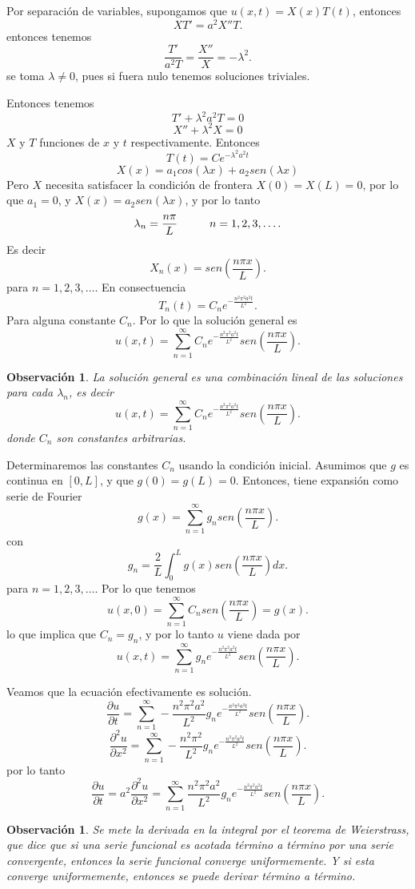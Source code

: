 \documentclass[11pt]{book}
\theoremstyle{plain}
\newtheorem{obs}[proposición]{Observación}
\theoremstyle{definition}
\begin{document}
Por separación de variables, supongamos que $u(x,t) = X(x)T(t)$, entonces
\[
XT' = a^{2}X''T
.\]
entonces tenemos
\[
\frac{T'}{a^{2}T} = \frac{X''}{X} = -\lambda^{2}
.\]
se toma $\lambda \neq 0$, pues si fuera nulo tenemos soluciones triviales.

Entonces tenemos
\[
T' + \lambda^{2}a^{2}T = 0
\]
\[
X'' + \lambda^{2}X = 0
\]
$X$ y $T$ funciones de $x$ y $t$ respectivamente. Entonces
\[
T(t) = C e^{-\lambda^{2}a^{2}t}
\]
\[
X(x) = a_{1}cos(\lambda x) + a_{2}sen(\lambda x)
\]
Pero $X$ necesita satisfacer la condición de frontera $X(0) = X(L) = 0$, por lo que $a_{1} = 0$, y $X(x) = a_{2}sen(\lambda x)$, y por lo tanto
\[
    \lambda_{n} = \frac{n\pi}{L} \hspace{10mm} n = 1,2,3,\dots
.\]
Es decir 
\[
    X_{n}(x) = sen(\frac{n\pi x}{L})
.\]
para $n = 1,2,3,\dots$. En consectuencia
\[
    T_{n}(t) = C_{n}e^{-\frac{n^{2}\pi^{2}a^{2}t}{L^{2}}}
.\]
Para alguna constante $C_{n}$. Por lo que la solución general es
\[
    u(x,t) = \sum_{n=1}^{\infty} C_{n}e^{-\frac{n^{2}\pi^{2}a^{2}t}{L^{2}}}sen(\frac{n\pi x}{L})
.\]

\begin{obs}
    La solución general es una combinación lineal de las soluciones para cada $\lambda_{n}$, es decir
    \[
        u(x,t) = \sum_{n=1}^{\infty} C_{n}e^{-\frac{n^{2}\pi^{2}a^{2}t}{L^{2}}}sen(\frac{n\pi x}{L})
    .\]
    donde $C_{n}$ son constantes arbitrarias.
\end{obs}

Determinaremos las constantes $C_{n}$ usando la condición inicial. Asumimos que $g$ es continua en $[0,L]$, y que $g(0) = g(L) = 0$. Entonces, tiene expansión como serie de Fourier
\[
    g(x) = \sum_{n=1}^{\infty} g_{n}sen(\frac{n\pi x}{L})
.\]
con
\[
    g_{n} = \frac{2}{L}\int_{0}^{L} g(x)sen(\frac{n\pi x}{L})dx
.\]
para $n = 1,2,3,\dots$. Por lo que tenemos 
\[
    u(x,0) = \sum_{n=1}^{\infty} C_{n}sen(\frac{n\pi x}{L}) = g(x)
.\]
lo que implica que $C_{n} = g_{n}$, y por lo tanto $u$ viene dada por
\[
    u(x,t) = \sum_{n=1}^{\infty} g_{n}e^{-\frac{n^{2}\pi^{2}a^{2}t}{L^{2}}}sen(\frac{n\pi x}{L})
.\]

Veamos que la ecuación efectivamente es solución.
\[
    \frac{\partial u}{\partial t} = \sum_{n=1}^{\infty} -\frac{n^{2}\pi^{2}a^{2}}{L^{2}}g_{n}e^{-\frac{n^{2}\pi^{2}a^{2}t}{L^{2}}}sen(\frac{n\pi x}{L})
.\]
\[
    \frac{\partial^2 u}{\partial x^2} = \sum_{n=1}^{\infty} -\frac{n^{2}\pi^{2}}{L^{2}}g_{n}e^{-\frac{n^{2}\pi^{2}a^{2}t}{L^{2}}}sen(\frac{n\pi x}{L})
.\]
por lo tanto
\[
    \frac{\partial u}{\partial t} = a^{2} \frac{\partial^2 u}{\partial x^2} = \sum_{n=1}^{\infty} \frac{n^{2}\pi^{2}a^{2}}{L^{2}}g_{n}e^{-\frac{n^{2}\pi^{2}a^{2}t}{L^{2}}}sen(\frac{n\pi x}{L})
.\]
\begin{obs}
Se mete la derivada en la integral por el teorema de Weierstrass, que dice que si una serie funcional es acotada término a término por una serie convergente, entonces la serie funcional converge uniformemente. Y si esta converge uniformemente, entonces se puede derivar término a término.
\end{obs}
\end{document}
